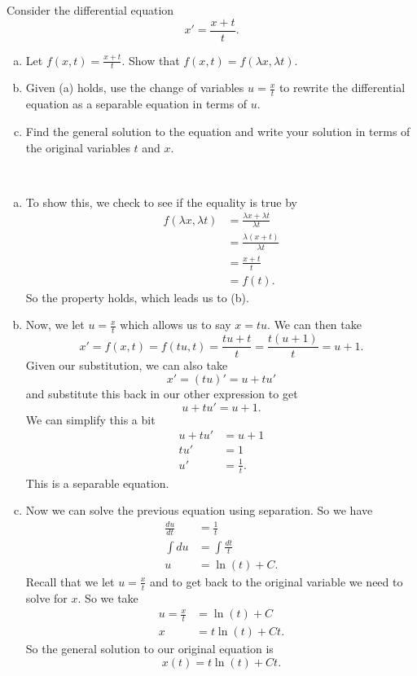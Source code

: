 \documentclass[12pt]{article} %
\begin{document}
\newpage
\begin{problem}
Consider the differential equation
\[
x'=\frac{x+t}{t}.
\]
\begin{enumerate}[(a)]
    \item Let $f(x,t)=\frac{x+t}{t}$. Show that $f(x,t)=f(\lambda x, \lambda t)$.
    \item Given (a) holds, use the change of variables $u=\frac{x}{t}$ to rewrite the differential equation as a separable equation in terms of $u$.
    \item Find the general solution to the equation and write your solution in terms of the original variables $t$ and $x$.
\end{enumerate}
\end{problem}
\begin{solution}~
\begin{enumerate}[(a)]
    \item To show this, we check to see if the equality is true by 
    \begin{align*}
        f(\lambda x, \lambda t) &= \frac{\lambda x + \lambda t}{\lambda t}\\
        &= \frac{\lambda(x+t)}{\lambda t}\\
        &= \frac{x+t}{t}\\
        &= f(t).
    \end{align*}
    So the property holds, which leads us to (b).
    \item Now, we let $u=\frac{x}{t}$ which allows us to say $x=tu$.  We can then take
    \[
    x' = f(x,t) = f(tu,t)=\frac{tu+t}{t}=\frac{t(u+1)}{t}=u+1.
    \]
    Given our substitution, we can also take
    \[
    x'=(tu)'=u+tu'
    \]
    and substitute this back in our other expression to get
    \[
    u+tu'=u+1.
    \]
    We can simplify this a bit
    \begin{align*}
        u+tu'&=u+1\\
        tu'&= 1\\
        u'&=\frac{1}{t}.
    \end{align*}
    This is a separable equation.
    \item Now we can solve the previous equation using separation. So we have
    \begin{align*}
        \frac{du}{dt}&= \frac{1}{t}\\
        \int du &= \int \frac{dt}{t}\\
        u&= \ln(t)+C.
    \end{align*}
    Recall that we let $u=\frac{x}{t}$ and to get back to the original variable we need to solve for $x$. So we take
    \begin{align*}
        u=\frac{x}{t}&=\ln(t)+C\\
        x&=t\ln(t)+Ct.
    \end{align*}
    So the general solution to our original equation is
    \[
    \boxed{x(t)=t\ln(t)+Ct.}
    \]
\end{enumerate}
\end{solution}
\end{document}

